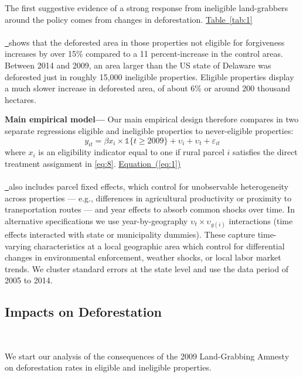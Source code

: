 \documentclass[12pt]{article}
\newcommand*{\tabref}[2][]{%
  \hyperref[{tab:#2}]{%
    Table~\ref*{tab:#2}%
    \ifx\\#1\\%
    \else
      \,#1%
    \fi
  }%
}
\newcommand*{\eqreffmt}[2][]{%
  \hyperref[{fig:#2}]{%
    Equation~(\ref*{eq:#2})%
    \ifx\\#1\\%
    \else
      \,#1%
    \fi
  }%
}
\begin{document}
\quad The first suggestive evidence of a strong response from ineligible land-grabbers around the policy comes from changes in deforestation. \tabref{1} shows that the deforested area in those properties not eligible for forgiveness increases by over 15\% compared to a 11 percent-increase in the control areas. Between 2014 and 2009, an area larger than the US state of Delaware was deforested just in roughly 15,000 ineligible properties. Eligible properties display a much slower increase in deforested area, of about 6\% or around 200 thousand hectares.
\ 

\textbf{Main empirical model---} Our main empirical design therefore compares in two separate regressions eligible and ineligible properties to never-eligible properties: 
\begin{equation}
 y_{it}   = \beta x_i\times\mathbb{1}\{t\geq 2009\}+\upsilon_i+\upsilon_t+\varepsilon_{it} \label{eq:1}
\end{equation}
where $x_i$ is an eligibility indicator equal to one if rural parcel $i$ satisfies the direct treatment assignment in \eqref{eq:8}. \eqreffmt{1} also includes parcel fixed effects, which control for unobservable heterogeneity across properties --- e.g., differences in agricultural productivity or proximity to transportation routes --- and year effects to absorb common shocks over time. In alternative specifications we use year-by-geography $\upsilon_t\times\upsilon_{g(i)}$ interactions (time effects interacted with state or municipality dummies). These capture time-varying characteristics at a local geographic area which control for differential changes in environmental enforcement, weather shocks, or local labor market trends. We cluster standard errors at the state level and use the data period of 2005 to 2014. %

\subsection{Impacts on Deforestation}
\ 

\quad We start our analysis of the consequences of the 2009 Land-Grabbing Amnesty on deforestation rates in eligible and ineligible properties. 
\
\end{document}
